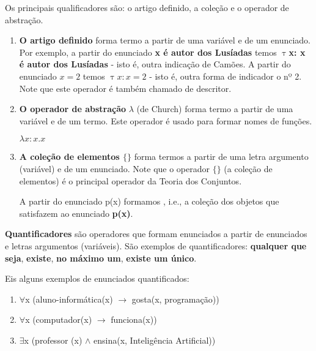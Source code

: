 \begin{enumerate}[label=\arabic*)]
    Os principais qualificadores são: o artigo definido, a coleção e o operador de abstração.

    \begin{enumerate}[label={\textbf{--}}]
        \item \textbf{O artigo definido} forma termo a partir de uma variável e de um enunciado.
        Por exemplo, a partir do enunciado \textbf{x é autor dos Lusíadas} temos \textbf{$\uptau$x: x é autor dos Lusíadas} - isto é, outra indicação de Camões.
        A partir do enunciado \textbf{$x = 2$} temos $\uptau x: x = 2$ - isto é, outra forma de indicador o nº 2.
        Note que este operador é também chamado de descritor.

        \item \textbf{O operador de abstração} $\lambda$ (de Church) forma termo a partir de uma variável e de um termo.
        Este operador é usado para formar nomes de funções.

        \setcounter{exemplo}{0}
        \begin{exemplo}
            $\lambda x: x.x$
        \end{exemplo}

        \item \textbf{A coleção de elementos $\{ \}$} forma termos a partir de uma letra argumento (variável) e de um enunciado.
        Note que o operador $\{ \}$ (a coleção de elementos) é o principal operador da Teoria dos Conjuntos.

        A partir do enunciado p(x) formamos , i.e., a coleção dos objetos que satisfazem ao enunciado \textbf{p(x)}. %
    \end{enumerate}

    \textbf{Quantificadores} são operadores que formam enunciados a partir de enunciados e letras argumentos (variáveis).
    São exemplos de quantificadores: \textbf{qualquer que seja}, \textbf{existe}, \textbf{no máximo um}, \textbf{existe um único}.

    Eis alguns exemplos de enunciados quantificados:

    \begin{enumerate}[label=\arabic*)]
        \item $\forall$x (aluno-informática(x) $\to$ gosta(x, programação))
        \item $\forall$x (computador(x) $\to$ funciona(x))
        \item $\exists$x (professor (x) $\land$ ensina(x, Inteligência Artificial))
    \end{enumerate}


\end{enumerate}
